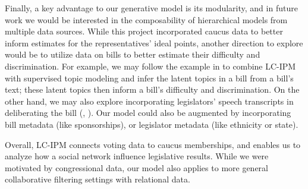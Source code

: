 \documentclass[a4paper]{article}
\begin{document}
Finally, a key advantage to our generative model is its modularity, and in future work we would be interested in the composability of hierarchical models from multiple data sources. While this project incorporated caucus data to better inform estimates for the representatives' ideal points, another direction to explore would be to utilize data on bills to better estimate their difficulty and discrimination. For example, we may follow the example in \cite{Gerrish2011} to combine LC-IPM with supervised topic modeling and infer the latent topics in a bill from a bill's text; these latent topics then inform a bill's difficulty and discrimination. On the other hand, we may also explore incorporating legislators' speech transcripts in deliberating the bill (\cite{Quinn2006}, \cite{Thomas2006}). Our model could also be augmented by incorporating bill metadata (like sponsorships), or legislator metadata (like ethnicity or state). \par

Overall, LC-IPM connects voting data to caucus memberships, and enables us to analyze how a social network influence legislative results. While we were motivated by congressional data, our model also applies to more general collaborative filtering settings with relational data.



%
%
\end{document}
